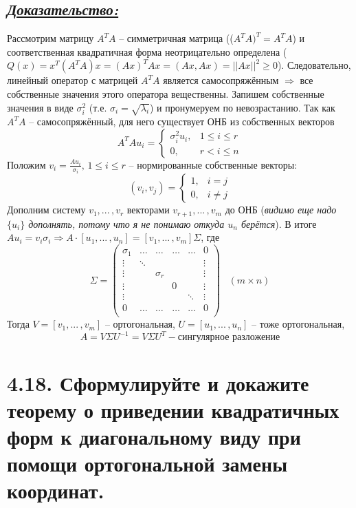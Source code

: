 \documentclass{article}
\begin{document}
\subsection*{\Large \underline{\textit{Доказательство: }}}
Рассмотрим матрицу $A^TA$ -- симметричная матрица (($A^TA)^T = A^TA$) и соответственная квадратичная форма неотрицательно определена ($Q(x) = x^T(A^TA)x = (Ax)^TAx = (Ax, Ax) = ||Ax||^2 \ge 0$). Следовательно, линейный оператор с матрицей $A^TA$ является самосопряжённым $\Rightarrow$ все собственные значения этого оператора вещественны. Запишем собственные значения в виде $\sigma_i^2$ (т.е. $\sigma_i = \sqrt{\lambda_i}$) и пронумеруем по невозрастанию. Так как $A^TA$ -- самосопряжённый, для него существует ОНБ из собственных векторов
$$
A^TAu_i = 
\begin{cases}
\sigma_i^2u_i, & 1 \le i \le r \\
0, & r < i \le n
\end{cases}
$$
Положим $v_i = \frac{Au_i}{\sigma_i}, \, 1 \le i \le r $ -- нормированные собственные векторы:
$$
(v_i, v_j) = 
\begin{cases}
1, & i = j \\
0, & i \ne j
\end{cases}
$$
Дополним систему $v_1, ...\,, v_r$ векторами $v_{r+1}, ...\,, v_{m}$ до ОНБ (\textit{видимо еще надо $\{u_i\}$ дополнять, потому что я не понимаю откуда $u_n$ берётся}).
\newline В итоге $Au_i = v_i\sigma_i \Rightarrow A\cdot[u_1, ...\,, u_n] = [v_1, ...\,, v_m]\Sigma$, где
$$
\Sigma = 
\begin{pmatrix}
\sigma_1 & \dots & \dots & \dots & \dots & 0 \\
\vdots & \ddots & & & &\vdots \\
\vdots &  & \sigma_r & & & \vdots \\
\vdots &  &  & 0 & & \vdots\\
\vdots & & &  & \ddots & \vdots \\
0 & \dots & \dots & \dots & \dots & 0 \\
\end{pmatrix}
\;\;\; (m \times n)
$$
Тогда $V = [v_1, ...\,, v_m]$ -- ортогональная, $U = [u_1, ...\,, u_n]$ -- тоже ортогональная,
$$
A = V\Sigma U^{-1} = V\Sigma U^T - \mbox{сингулярное разложение}
$$

\section*{\LARGE 4.18. Сформулируйте и докажите теорему о приведении квадратичных форм к диагональному виду при помощи ортогональной замены координат.  }
\end{document}
